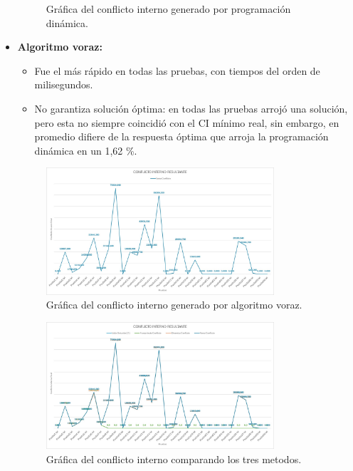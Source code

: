\documentclass[11pt,letter]{article}
\begin{document}
\begin{itemize}
\begin{figure}[H]
            \caption{Gráfica del conflicto interno generado por programación dinámica.}
        \end{figure}
        \item \textbf{Algoritmo voraz:}
        \begin{itemize}
            \item Fue el más rápido en todas las pruebas, con tiempos del orden de milisegundos.
            \item No garantiza solución óptima: en todas las pruebas arrojó una solución, pero esta no siempre coincidió con el CI mínimo real, sin embargo, en promedio difiere de la respuesta óptima que arroja la programación dinámica en un 1,62 \%.
        \end{itemize}
        \begin{figure}[H]
            \centering
            \includegraphics[width=0.8\textwidth]{resources/conflicto3.jpeg}
            \caption{Gráfica del conflicto interno generado por algoritmo voraz.}
        \end{figure}
        \begin{figure}[H]
            \centering
            \includegraphics[width=0.8\textwidth]{resources/conflicto4.jpeg}
            \caption{Gráfica del conflicto interno comparando los tres metodos.}
        \end{figure}
    \end{itemize}
\end{document}
